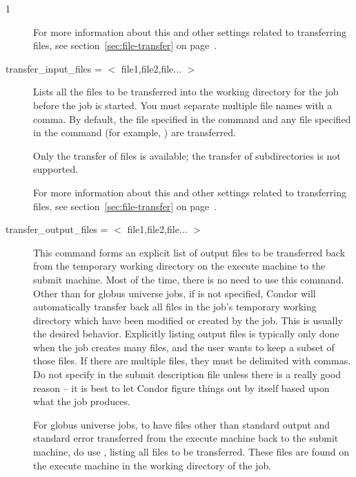 \begin{ManPage}{\label{man-condor-submit}}{1}
\begin{description}
For more information about this and other settings related to
transferring files, see section~\ref{sec:file-transfer} on
page~\pageref{sec:file-transfer}.



\item[transfer\_input\_files = $<$ file1,file2,file... $>$] 
Lists all the files to be transferred into the 
working directory for the job before the job is started.
You must separate multiple file names with a comma.
By default, the file specified in the
 command and any file specified in the 
command (for example, ) are transferred.

Only the transfer of files is available; the transfer of
subdirectories is not supported.

For more information about this and other settings related to
transferring files, see section~\ref{sec:file-transfer} on
page~\pageref{sec:file-transfer}.



\item[transfer\_output\_files = $<$ file1,file2,file... $>$] 
This command forms an explicit list of output files to be transferred
back from the temporary working directory on the execute machine to
the submit machine.
Most of the time, there is no need to use this command.
Other than for globus universe jobs,
if  is not specified,
Condor will automatically transfer back all files in the job's
temporary working directory which have been
modified or created by the job.
This is usually the desired behavior.
Explicitly listing output files is typically only done when the job creates
many files, and the user wants to keep a subset of
those files. 
If there are multiple files, they must be delimited with commas.
\Warn Do not specify  in the
submit description file unless there is a really good reason -- it is
best to let Condor figure things out by itself based upon what
the job produces.

For globus universe jobs,
to have files other than standard output and standard error transferred
from the execute machine back to the submit machine,
do use , listing
all files to be transferred.
These files are found on the execute machine in the
working directory of the job.


\end{description}
\end{ManPage}
